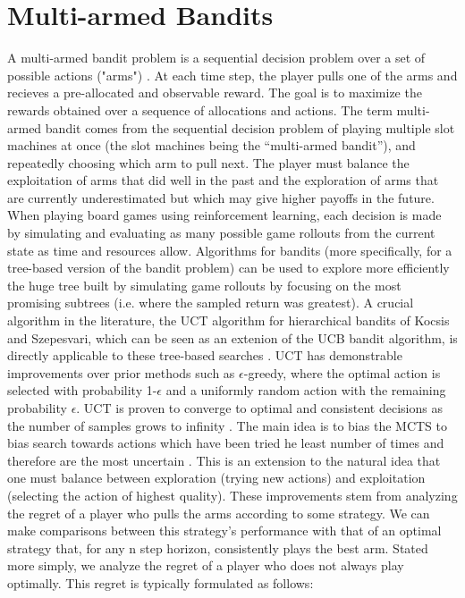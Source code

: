 \documentclass[msc, deptreport, ai, romanprepages]{infthesis}
\begin{document}
\section{Multi-armed Bandits}
A multi-armed bandit problem is a sequential decision problem over a set of possible actions ("arms") \cite{robbins1952}. At each time step, the player pulls one of the arms and recieves a pre-allocated and observable reward. The goal is to maximize the rewards obtained over a sequence of allocations and actions. The term multi-armed bandit comes from the sequential decision problem of playing multiple slot machines at once (the slot machines being the “multi-armed bandit”), and repeatedly choosing which arm to pull next. The player must balance the exploitation of arms that did well in the past and the exploration of arms that are currently underestimated but which may give higher payoffs in the future. 
When playing board games using reinforcement learning, each decision is made by simulating and evaluating as many possible game rollouts from the current state as time and resources allow. Algorithms for bandits (more specifically, for a tree-based version of the bandit problem) can be used to explore more efficiently the huge tree built by simulating game rollouts by focusing on the most promising subtrees (i.e. where the sampled return was greatest). A crucial algorithm in the literature, the UCT algorithm for hierarchical bandits of Kocsis and Szepesvari, which can be seen as an extenion of the UCB bandit algorithm, is directly applicable to these tree-based searches \cite{Kocsis2006}. UCT has demonstrable improvements over prior methods such as \(\epsilon\)-greedy, where the optimal action is selected with probability 1-\(\epsilon\) and a uniformly random action with the remaining probability \(\epsilon\). UCT is proven to converge to optimal and consistent decisions as the number of samples grows to infinity \cite{Kocsis2006}. The main idea is to bias the MCTS to bias search towards actions which have been tried he least number of times and therefore are the most uncertain \cite{Gelly}. This is an extension to the natural idea that one must balance between exploration (trying new actions) and exploitation (selecting the action of highest quality). These improvements stem from analyzing the regret of a player who pulls the arms according to some strategy. We can make comparisons between this strategy's performance with that of an optimal strategy that, for any n step horizon, consistently plays the best arm. Stated more simply, we analyze the regret of a player who does not always play optimally. This regret is typically formulated as follows:
\end{document}
